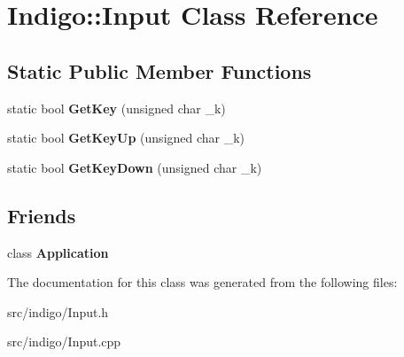 \hypertarget{class_indigo_1_1_input}{}\section{Indigo\+:\+:Input Class Reference}
\label{class_indigo_1_1_input}
\subsection*{Static Public Member Functions}
\begin{DoxyCompactItemize}
\item 
\mbox{\label{class_indigo_1_1_input_ac6e91d4097ed5fc3d5a44392f2c1e610}} 
static bool {\bfseries Get\+Key} (unsigned char \+\_\+k)
\item 
\mbox{\label{class_indigo_1_1_input_ad91170750b641e0e3b371185e9fbd55f}} 
static bool {\bfseries Get\+Key\+Up} (unsigned char \+\_\+k)
\item 
\mbox{\label{class_indigo_1_1_input_a22df61c9b96bbadbd07e255465994a64}} 
static bool {\bfseries Get\+Key\+Down} (unsigned char \+\_\+k)
\end{DoxyCompactItemize}
\subsection*{Friends}
\begin{DoxyCompactItemize}
\item 
\mbox{\label{class_indigo_1_1_input_a23f25bcc02a0e94c2f5a4188496b04d0}} 
class {\bfseries Application}
\end{DoxyCompactItemize}


The documentation for this class was generated from the following files\+:\begin{DoxyCompactItemize}
\item 
src/indigo/Input.\+h\item 
src/indigo/Input.\+cpp\end{DoxyCompactItemize}
